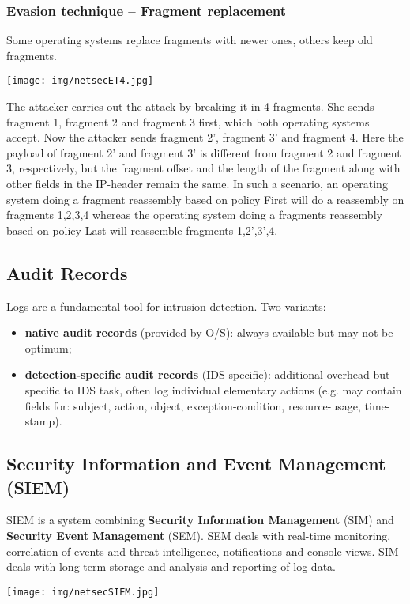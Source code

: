 \documentclass[a4paper, 10pt, titlepage]{article}
\begin{document}
\subsubsection*{Evasion technique – Fragment replacement}
Some operating systems replace fragments with newer ones, others keep old fragments.
\begin{center}
	\texttt{[image: img/netsecET4.jpg]}
\end{center}
The attacker carries out the attack by breaking it in 4 fragments. She sends fragment 1, fragment 2 and fragment 3 first, which both operating systems accept. Now the attacker sends fragment 2', fragment 3' and fragment 4. Here the payload of fragment 2' and fragment 3' is different from fragment 2 and fragment 3, respectively, but the fragment offset and the length of the fragment along with other fields in the IP-header remain the same. In such a scenario, an operating system doing a fragment reassembly based on policy First will do a reassembly on fragments 1,2,3,4 whereas the operating system doing a fragments reassembly based on policy Last will reassemble fragments 1,2',3',4.

\subsection{Audit Records}
Logs are a fundamental tool for intrusion detection. Two variants:
\begin{itemize}
	\item \textbf{native audit records} (provided by O/S): always available but may not be optimum;
	\item \textbf{detection-specific audit records} (IDS specific): additional overhead but specific to IDS task, often log individual elementary actions (e.g. may contain fields for: subject, action, object, exception-condition, resource-usage, time-stamp).
\end{itemize}

\newpage
\subsection{Security Information and Event Management (SIEM)} 
SIEM is a system combining \textbf{Security Information Management} (SIM) and \textbf{Security Event Management} (SEM). SEM deals with real-time monitoring, correlation of events and threat intelligence, notifications and console views. SIM deals with long-term storage and analysis and reporting of log data.
\begin{center}
	\texttt{[image: img/netsecSIEM.jpg]}
\end{center}
\end{document}
